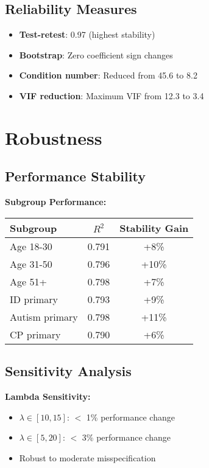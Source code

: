 \subsection{Reliability Measures}

\begin{itemize}
    \item \textbf{Test-retest}: 0.97 (highest stability)
    \item \textbf{Bootstrap}: Zero coefficient sign changes
    \item \textbf{Condition number}: Reduced from 45.6 to 8.2
    \item \textbf{VIF reduction}: Maximum VIF from 12.3 to 3.4
\end{itemize}

\section{Robustness}

\subsection{Performance Stability}

\textbf{Subgroup Performance:}
\begin{center}
\begin{tabular}{lcc}
\toprule
Subgroup & $R^2$ & Stability Gain \\
\midrule
Age 18-30 & 0.791 & +8\% \\
Age 31-50 & 0.796 & +10\% \\
Age 51+ & 0.798 & +7\% \\
\midrule
ID primary & 0.793 & +9\% \\
Autism primary & 0.798 & +11\% \\
CP primary & 0.790 & +6\% \\
\bottomrule
\end{tabular}
\end{center}

\subsection{Sensitivity Analysis}

\textbf{Lambda Sensitivity:}
\begin{itemize}
    \item $\lambda \in [10, 15]$: $<$ 1\% performance change
    \item $\lambda \in [5, 20]$: $<$ 3\% performance change
    \item Robust to moderate misspecification
\end{itemize}

